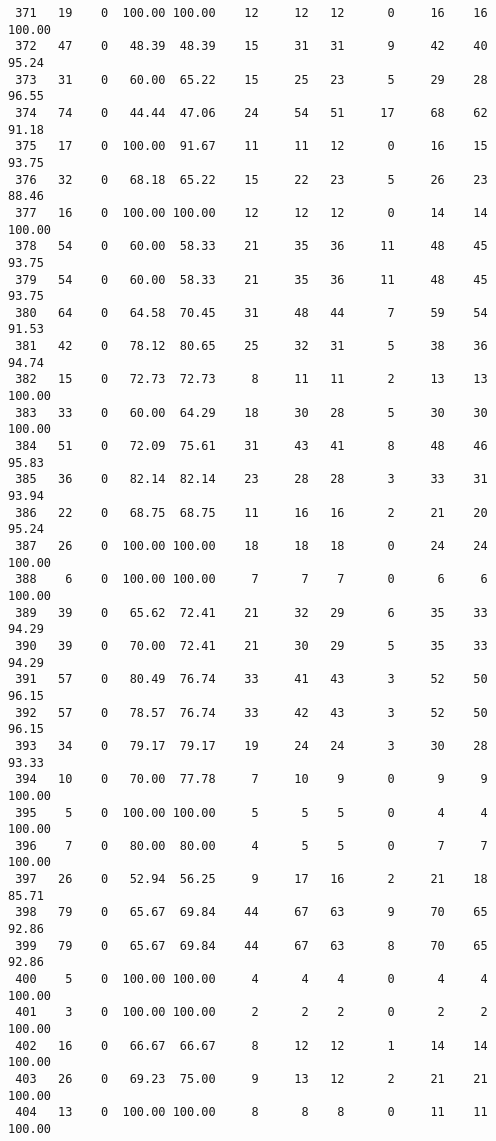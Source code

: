 \begin{verbatim}
 371   19    0  100.00 100.00    12     12   12      0     16    16   100.00
 372   47    0   48.39  48.39    15     31   31      9     42    40    95.24
 373   31    0   60.00  65.22    15     25   23      5     29    28    96.55
 374   74    0   44.44  47.06    24     54   51     17     68    62    91.18
 375   17    0  100.00  91.67    11     11   12      0     16    15    93.75
 376   32    0   68.18  65.22    15     22   23      5     26    23    88.46
 377   16    0  100.00 100.00    12     12   12      0     14    14   100.00
 378   54    0   60.00  58.33    21     35   36     11     48    45    93.75
 379   54    0   60.00  58.33    21     35   36     11     48    45    93.75
 380   64    0   64.58  70.45    31     48   44      7     59    54    91.53
 381   42    0   78.12  80.65    25     32   31      5     38    36    94.74
 382   15    0   72.73  72.73     8     11   11      2     13    13   100.00
 383   33    0   60.00  64.29    18     30   28      5     30    30   100.00
 384   51    0   72.09  75.61    31     43   41      8     48    46    95.83
 385   36    0   82.14  82.14    23     28   28      3     33    31    93.94
 386   22    0   68.75  68.75    11     16   16      2     21    20    95.24
 387   26    0  100.00 100.00    18     18   18      0     24    24   100.00
 388    6    0  100.00 100.00     7      7    7      0      6     6   100.00
 389   39    0   65.62  72.41    21     32   29      6     35    33    94.29
 390   39    0   70.00  72.41    21     30   29      5     35    33    94.29
 391   57    0   80.49  76.74    33     41   43      3     52    50    96.15
 392   57    0   78.57  76.74    33     42   43      3     52    50    96.15
 393   34    0   79.17  79.17    19     24   24      3     30    28    93.33
 394   10    0   70.00  77.78     7     10    9      0      9     9   100.00
 395    5    0  100.00 100.00     5      5    5      0      4     4   100.00
 396    7    0   80.00  80.00     4      5    5      0      7     7   100.00
 397   26    0   52.94  56.25     9     17   16      2     21    18    85.71
 398   79    0   65.67  69.84    44     67   63      9     70    65    92.86
 399   79    0   65.67  69.84    44     67   63      8     70    65    92.86
 400    5    0  100.00 100.00     4      4    4      0      4     4   100.00
 401    3    0  100.00 100.00     2      2    2      0      2     2   100.00
 402   16    0   66.67  66.67     8     12   12      1     14    14   100.00
 403   26    0   69.23  75.00     9     13   12      2     21    21   100.00
 404   13    0  100.00 100.00     8      8    8      0     11    11   100.00

\end{verbatim}
